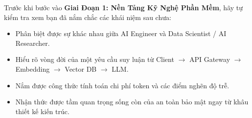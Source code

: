 \begin{checkpointbox}
Trước khi bước vào \textbf{Giai Đoạn 1: Nền Tảng Kỹ Nghệ Phần Mềm}, hãy tự kiểm tra xem bạn đã nắm chắc các khái niệm sau chưa:
\begin{itemize}
  \item[$\square$] Phân biệt được sự khác nhau giữa AI Engineer và Data Scientist / AI Researcher.
  \item[$\square$] Hiểu rõ vòng đời của một yêu cầu suy luận từ Client $\rightarrow$ API Gateway $\rightarrow$ Embedding $\rightarrow$ Vector DB $\rightarrow$ LLM.
  \item[$\square$] Nắm được công thức tính toán chi phí token và các điểm nghẽn độ trễ.
  \item[$\square$] Nhận thức được tầm quan trọng sống còn của an toàn bảo mật ngay từ khâu thiết kế kiến trúc.
\end{itemize}
\end{checkpointbox}

